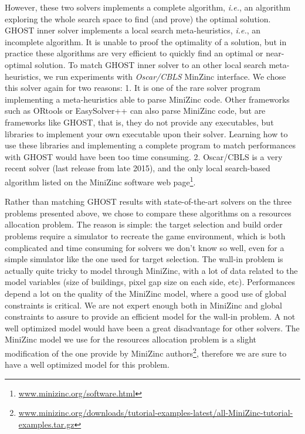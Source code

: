 \documentclass[journal]{IEEEtran}
\newcommand{\ghost}{\textsc{GHOST}\xspace}
\newcommand{\ie}{\textit{i.e.}}
\begin{document}
However, these  two solvers implements  a complete algorithm,  \ie, an
algorithm exploring  the whole  search space to  find (and  prove) the
optimal  solution.   \ghost inner  solver  implements  a local  search
meta-heuristics, \ie, an  incomplete algorithm. It is  unable to proof
the optimality  of a  solution, but in  practice these  algorithms are
very efficient to quickly find an optimal or near-optimal solution. To
match \ghost inner solver to an other local search meta-heuristics, we
run experiments  with {\it  Oscar/CBLS} MinZinc interface.   We chose
this solver  again for two  reasons: 1. It is  one of the  rare solver
program  implementing   a  meta-heuristics  able  to   parse  MiniZinc
code. Other frameworks such as  ORtools or EasySolver++ can also parse
MiniZinc code,  but are frameworks like  \ghost, that is, they  do not
provide  any   executables,  but  libraries  to   implement  your  own
executable upon their solver.  Learning how to use these libraries and
implementing  a complete  program  to match  performances with  \ghost
would have been  too time consuming.  2.  Oscar/CBLS is  a very recent
solver (last release from late  2015), and the only local search-based
algorithm     listed     on      the     MiniZinc     software     web
page\footnote{\href{http://www.minizinc.org/software.html}{www.minizinc.org/software.html}}.

Rather than  matching \ghost results with  state-of-the-art solvers on
the  three  problems  presented  above, we  chose  to  compare  these
algorithms on  a resources allocation  problem. The reason  is simple:
the target selection  and build order problems require  a simulator to
recreate  the game  environment, which  is both  complicated and  time
consuming  for solvers  we  don't  know so  well,  even  for a  simple
simulator like the one used  for target selection. The wall-in problem
is actually quite tricky to model through MiniZinc, with a lot of data
related to the  model variables (size of buildings, pixel  gap size on
each side,  etc).  Performances  depend a  lot on  the quality  of the
MiniZinc model, where a good use of global constraints is critical. We
are  not expert  enough both  in  MiniZinc and  global constraints  to
assure to provide  an efficient model for the wall-in  problem.  A not
well optimized  model would have  been a great disadvantage  for other
solvers.   The MiniZinc  model  we use  for  the resources  allocation
problem  is a  slight  modification  of the  one  provide by  MiniZinc
authors\footnote{\href{http://www.minizinc.org/downloads/tutorial-examples-latest/all-MiniZinc-tutorial-examples.tar.gz}{www.minizinc.org/downloads/tutorial-examples-latest/all-MiniZinc-tutorial-examples.tar.gz}},
therefore we are sure to have a well optimized model for this problem.
\end{document}
